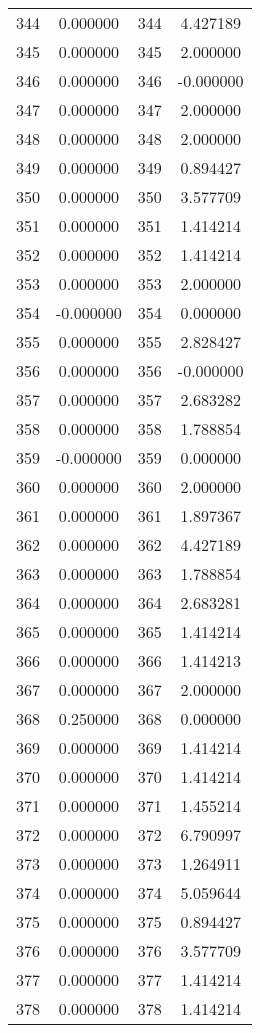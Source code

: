 \documentclass[12pt]{article}
\begin{document}
\begin{longtable}{@{}cccc@{}}
344 & 0.000000 & 344 & 4.427189 \\
345 & 0.000000 & 345 & 2.000000 \\
346 & 0.000000 & 346 & -0.000000 \\
347 & 0.000000 & 347 & 2.000000 \\
348 & 0.000000 & 348 & 2.000000 \\
349 & 0.000000 & 349 & 0.894427 \\
350 & 0.000000 & 350 & 3.577709 \\
351 & 0.000000 & 351 & 1.414214 \\
352 & 0.000000 & 352 & 1.414214 \\
353 & 0.000000 & 353 & 2.000000 \\
354 & -0.000000 & 354 & 0.000000 \\
355 & 0.000000 & 355 & 2.828427 \\
356 & 0.000000 & 356 & -0.000000 \\
357 & 0.000000 & 357 & 2.683282 \\
358 & 0.000000 & 358 & 1.788854 \\
359 & -0.000000 & 359 & 0.000000 \\
360 & 0.000000 & 360 & 2.000000 \\
361 & 0.000000 & 361 & 1.897367 \\
362 & 0.000000 & 362 & 4.427189 \\
363 & 0.000000 & 363 & 1.788854 \\
364 & 0.000000 & 364 & 2.683281 \\
365 & 0.000000 & 365 & 1.414214 \\
366 & 0.000000 & 366 & 1.414213 \\
367 & 0.000000 & 367 & 2.000000 \\
368 & 0.250000 & 368 & 0.000000 \\
369 & 0.000000 & 369 & 1.414214 \\
370 & 0.000000 & 370 & 1.414214 \\
371 & 0.000000 & 371 & 1.455214 \\
372 & 0.000000 & 372 & 6.790997 \\
373 & 0.000000 & 373 & 1.264911 \\
374 & 0.000000 & 374 & 5.059644 \\
375 & 0.000000 & 375 & 0.894427 \\
376 & 0.000000 & 376 & 3.577709 \\
377 & 0.000000 & 377 & 1.414214 \\
378 & 0.000000 & 378 & 1.414214 \\

\end{longtable}
\end{document}
